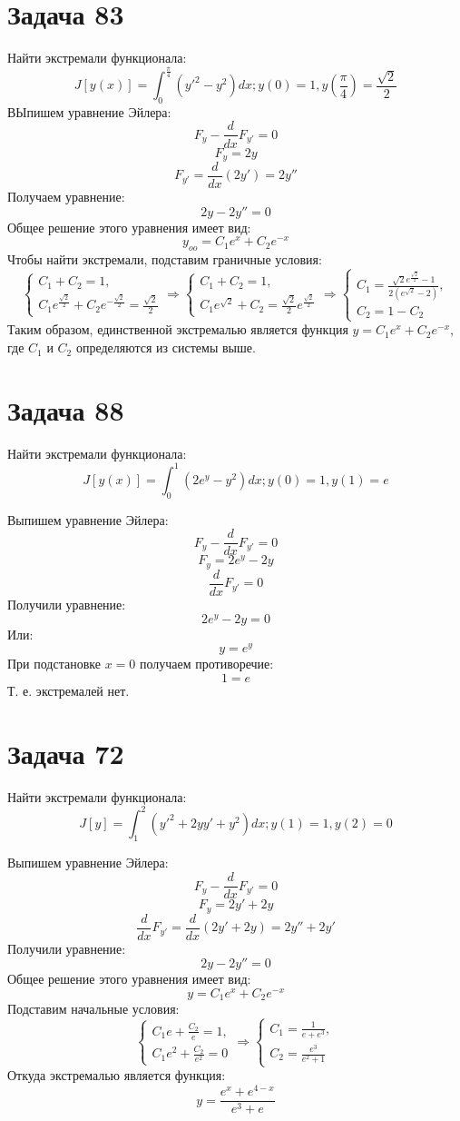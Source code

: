 \documentclass[11pt]{article}
\begin{document}
\section{Задача 83}
\label{sec:org3fa642e}
Найти экстремали функционала:
$$J[y(x)] = \int_0^{\frac{\pi}4}(y'^2 - y^2)dx; y(0) = 1, y\left(\frac{\pi}4\right) = \frac{\sqrt 2}2$$
ВЫпишем уравнение Эйлера:
$$F_y - \frac{d}{dx}F_{y'} = 0$$
$$F_y = 2y$$
$$F_{y'} = \frac{d}{dx}(2y') = 2y''$$
Получаем уравнение:
$$2y - 2y'' = 0$$
Общее решение этого уравнения имеет вид:
$$y_{oo} = C_1e^x + C_2e^{-x}$$
Чтобы найти экстремали, подставим граничные условия:
\begin{equation*}
\begin{cases}
C_1 + C_2 = 1, \\
C_1e^{\frac{\sqrt 2}2} + C_2e^{-\frac{\sqrt 2}2} = \frac{\sqrt 2}2
\end{cases}
\Rightarrow
\begin{cases}
C_1 + C_2 = 1, \\
C_1e^{\sqrt 2} + C_2 = \frac{\sqrt 2}2e^{\frac{\sqrt 2}2}
\end{cases}
\Rightarrow
\begin{cases}
C_1 = \frac{\sqrt 2e^{\frac{\sqrt 2}2} - 1}{2(e^{\sqrt 2} - 2)}, \\
C_2 = 1 - C_2
\end{cases}
\end{equation*}
Таким образом, единственной экстремалью является функция \(y = C_1e^x + C_2e^{-x}\), где \(C_1\) и \(C_2\) определяются
из системы выше.
\section{Задача 88}
\label{sec:org7097649}
Найти экстремали функционала:
$$J[y(x)] = \int_0^1(2e^y - y^2)dx; y(0) = 1, y(1) = e$$

Выпишем уравнение Эйлера:
$$F_y - \frac{d}{dx}F_{y'} = 0$$
$$F_y = 2e^y - 2y$$
$$\frac{d}{dx}F_{y'} = 0$$
Получили уравнение:
$$2e^y - 2y = 0$$
Или:
$$y = e^y$$
При подстановке \(x = 0\) получаем противоречие:
$$1 = e$$
Т. е. экстремалей нет.
\section{Задача 72}
\label{sec:org756539b}
Найти экстремали функционала:
$$J[y] = \int_1^2(y'^2 + 2yy' + y^2)dx; y(1) = 1, y(2) = 0$$

Выпишем уравнение Эйлера:
$$F_y - \frac{d}{dx}F_{y'} = 0$$
$$F_y = 2y' + 2y$$
$$\frac{d}{dx}F_{y'} = \frac{d}{dx}(2y' + 2y) = 2y'' + 2y'$$
Получили уравнение:
$$2y - 2y'' = 0$$
Общее решение этого уравнения имеет вид:
$$y = C_1e^x + C_2e^{-x}$$
Подставим начальные условия:
\begin{equation*}
\begin{cases}
C_1e + \frac{C_2}e = 1, \\
C_1e^2 + \frac{C_2}{e^2} = 0
\end{cases}
\Rightarrow
\begin{cases}
C_1 = \frac{1}{e + e^3}, \\
C_2 = \frac{e^3}{e^2 + 1}
\end{cases}
\end{equation*}
Откуда экстремалью является функция:
$$y = \frac{e^x + e^{4 - x}}{e^3 + e}$$
\end{document}
